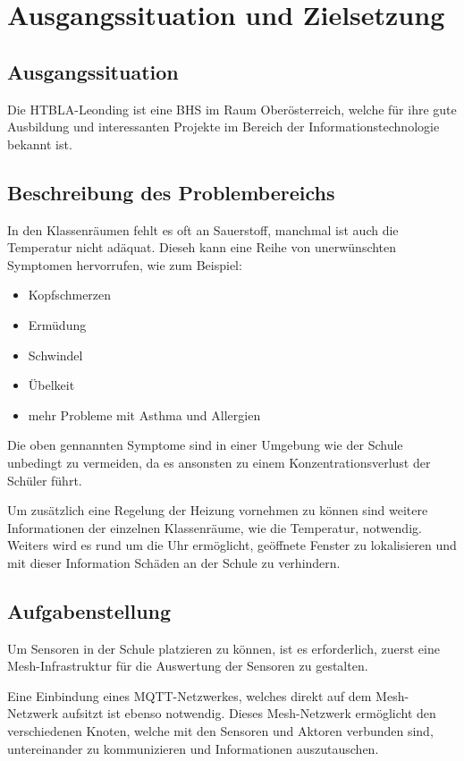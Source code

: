 \chapter{Ausgangssituation und Zielsetzung}

\section{Ausgangssituation}
Die HTBLA-Leonding ist eine BHS im Raum Oberösterreich, welche für ihre gute Ausbildung und interessanten Projekte im Bereich der Informationstechnologie bekannt ist.

\section{Beschreibung des Problembereichs}
In den Klassenräumen fehlt es oft an Sauerstoff, manchmal ist auch die Temperatur nicht adäquat. Dieseh kann eine Reihe von unerwünschten Symptomen hervorrufen, wie zum Beispiel: 

\begin{itemize}
    \item Kopfschmerzen
    \item Ermüdung
    \item Schwindel
    \item Übelkeit
    \item mehr Probleme mit Asthma und Allergien
\end{itemize}

Die oben gennannten Symptome sind in einer Umgebung wie der Schule unbedingt zu vermeiden, da es ansonsten zu einem Konzentrationsverlust der Schüler führt.

Um zusätzlich eine Regelung der Heizung vornehmen zu können sind weitere Informationen der einzelnen Klassenräume, wie die Temperatur, notwendig. Weiters wird es rund um die Uhr ermöglicht,  geöffnete Fenster zu lokalisieren und mit dieser Information Schäden an der Schule zu verhindern.

\section{Aufgabenstellung}
Um Sensoren in der Schule platzieren zu können, ist es erforderlich, zuerst eine Mesh-Infrastruktur für die Auswertung der Sensoren zu gestalten.

Eine Einbindung eines MQTT-Netzwerkes, welches direkt auf dem Mesh-Netzwerk aufsitzt ist ebenso notwendig. Dieses Mesh-Netzwerk ermöglicht den verschiedenen Knoten, welche mit den Sensoren und Aktoren verbunden sind, untereinander zu kommunizieren und Informationen auszutauschen.


